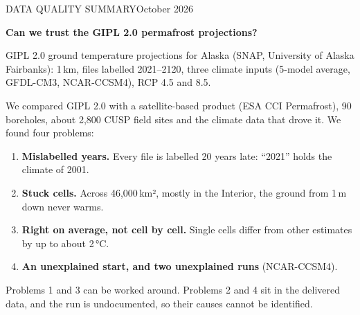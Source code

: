 \documentclass[10pt]{article}
\renewcommand\normalsize{\fontsize{8.9}{11.0}\selectfont}
\renewcommand\small{\fontsize{7.6}{9.3}\selectfont}
\begin{document}
\normalsize

{\small\color{ink2}\MakeUppercase{Data quality summary}\hfill October 2026\par}
\vspace{3pt}
{\fontsize{17}{20}\selectfont\bfseries Can we trust the GIPL 2.0 permafrost projections?\par}
\vspace{2pt}
{\color{ink2}GIPL 2.0 ground temperature projections for Alaska (SNAP, University of Alaska Fairbanks): 1\,km,
files labelled 2021--2120, three climate inputs (5-model average, GFDL-CM3, NCAR-CCSM4), RCP 4.5 and 8.5.\par}
\vspace{5pt}

\noindent\colorbox{boxbg}{\parbox{\dimexpr\linewidth-2\fboxsep}{\raggedright\vspace{2pt}%
We compared GIPL 2.0 with a satellite-based product (ESA CCI Permafrost), 90 boreholes, about 2,800 CUSP field sites
and the climate data that drove it. We found four problems:
\begin{enumerate}[label=\textbf{\textcolor{accent}{\arabic*}}, leftmargin=1.2em, topsep=1pt]
  \item \textbf{Mislabelled years.} Every file is labelled 20 years late: ``2021'' holds the climate of 2001.
  \item \textbf{Stuck cells.} Across 46,000\,km², mostly in the Interior, the ground from 1\,m down never warms.
  \item \textbf{Right on average, not cell by cell.} Single cells differ from other estimates by up to about 2\,°C.
  \item \textbf{An unexplained start, and two unexplained runs} (NCAR-CCSM4).
\end{enumerate}
\vspace{1pt}
Problems 1 and 3 can be worked around. Problems 2 and 4 sit in the delivered data, and the run is undocumented, so
their causes cannot be identified.\vspace{2pt}}}
\end{document}
